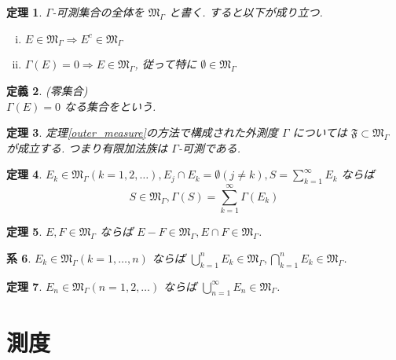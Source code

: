 \documentclass[dvipdfmx]{jsreport}
\newtheorem{theo}{定理}[section]
\newtheorem{defi}[theo]{定義}
\newtheorem{corr}[theo]{系}
\begin{document}
\begin{theo}
    $\Gamma$-可測集合の全体を $\mathfrak{M}_\Gamma$ と書く. すると以下が成り立つ. 
    \begin{enumerate}[(i)]
        \item $E \in \mathfrak{M}_\Gamma \Rightarrow E^c \in \mathfrak{M}_\Gamma$
        \item $\Gamma(E) = 0 \Rightarrow E \in \mathfrak{M}_\Gamma$, 従って特に $\emptyset \in \mathfrak{M}_\Gamma$
    \end{enumerate}
\end{theo}

\begin{defi}
    (零集合) \\
    $\Gamma(E) = 0$ なる集合をという. 
\end{defi}

\begin{theo}
    定理\ref{outer_measure}の方法で構成された外測度 $\Gamma$ については $\mathfrak{F} \subset \mathfrak{M}_\Gamma$ が成立する. つまり有限加法族は $\Gamma$-可測である. 
\end{theo}

\begin{theo}
    $\displaystyle E_k \in \mathfrak{M}_\Gamma (k = 1, 2, \dots), E_j \cap E_k = \emptyset (j \neq k), S = \sum_{k = 1}^\infty E_k$ ならば
    \begin{equation}
        S \in \mathfrak{M}_\Gamma, \Gamma(S) = \sum_{k = 1}^\infty \Gamma(E_k)
    \end{equation}
\end{theo}

\begin{theo}
    $E, F \in \mathfrak{M}_\Gamma$ ならば $E - F \in \mathfrak{M}_\Gamma, E \cap F \in \mathfrak{M}_\Gamma$. 
\end{theo}

\begin{corr}
    $E_k \in \mathfrak{M}_\Gamma (k = 1, \dots, n)$ ならば $\displaystyle \bigcup_{k = 1}^n E_k \in \mathfrak{M}_\Gamma, \bigcap_{k = 1}^n E_k \in \mathfrak{M}_\Gamma$. 
\end{corr}

\begin{theo}
    $E_n \in \mathfrak{M}_\Gamma (n = 1, 2, \dots)$ ならば $\displaystyle \bigcup_{n = 1}^\infty E_n \in \mathfrak{M}_\Gamma$. 
\end{theo}

\section{測度}
\end{document}
